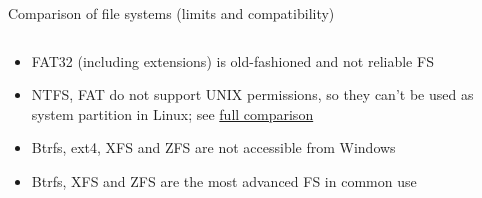 \documentclass[compress, ucs, xelatex, 11pt, xcolor=svgnames,
  hyperref={
    bookmarks=true,
    unicode=true,
    colorlinks=true,
    pdftitle={Linux, command line and MetaCentrum},
    plainpages=false,
    pdfauthor={Vojtech Zeisek},
    pdfsubject={Course about use of Linux command line, writing shell scripts and using MetaCentrum of CESNET},
    pdfcreator={XeLaTeX},
    pdfkeywords={Linux, GNU, BASH, shell, command line, MetaCentrum},
    linkcolor=DarkRed,
    anchorcolor=DarkBlue,
    citecolor=Indigo,
    filecolor=NavyBlue,
    menucolor=DarkMagenta,
    urlcolor=DarkBlue,
    pdftex},
  url={hyphens, lowtilde} %
  ]{beamer}
\begin{document}
\begin{frame}{Comparison of file systems (limits and compatibility)}
\begin{center}
\begin{footnotesize}
\begin{tabular}{ccccccc}
      \end{tabular}
    \end{footnotesize}
  \end{center}
  \begin{itemize}
    \item FAT32 (including extensions) is old-fashioned and not reliable FS
    \item NTFS, FAT do not support UNIX permissions, so they can't be used as system partition in Linux; see \href{https://en.wikipedia.org/wiki/Comparison_of_file_systems}{full comparison}
    \item Btrfs, ext4, XFS and ZFS are not accessible from Windows
    \item Btrfs, XFS and ZFS are the most advanced FS in common use
  \end{itemize}
\end{frame}
\end{document}
